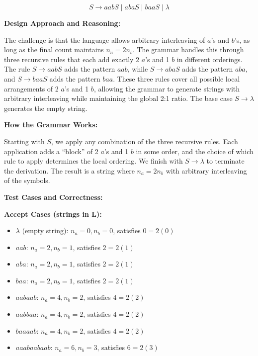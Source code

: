 \documentclass[12pt]{article}
\begin{document}
$$S \rightarrow aabS \mid abaS \mid baaS \mid \lambda$$

\textbf{Design Approach and Reasoning:}

The challenge is that the language allows arbitrary interleaving of $a$'s and $b$'s, as long as the final count maintains $n_a = 2n_b$. The grammar handles this through three recursive rules that each add exactly 2 $a$'s and 1 $b$ in different orderings. The rule $S \rightarrow aabS$ adds the pattern $aab$, while $S \rightarrow abaS$ adds the pattern $aba$, and $S \rightarrow baaS$ adds the pattern $baa$. These three rules cover all possible local arrangements of 2 $a$'s and 1 $b$, allowing the grammar to generate strings with arbitrary interleaving while maintaining the global 2:1 ratio. The base case $S \rightarrow \lambda$ generates the empty string.

\textbf{How the Grammar Works:}

Starting with $S$, we apply any combination of the three recursive rules. Each application adds a ``block'' of 2 $a$'s and 1 $b$ in some order, and the choice of which rule to apply determines the local ordering. We finish with $S \rightarrow \lambda$ to terminate the derivation. The result is a string where $n_a = 2n_b$ with arbitrary interleaving of the symbols.

\textbf{Test Cases and Correctness:}

\textbf{Accept Cases (strings in L):}
\begin{itemize}
\item $\lambda$ (empty string): $n_a=0, n_b=0$, satisfies $0 = 2(0)$ \checkmark
\item $aab$: $n_a=2, n_b=1$, satisfies $2 = 2(1)$ \checkmark
\item $aba$: $n_a=2, n_b=1$, satisfies $2 = 2(1)$ \checkmark
\item $baa$: $n_a=2, n_b=1$, satisfies $2 = 2(1)$ \checkmark
\item $aabaab$: $n_a=4, n_b=2$, satisfies $4 = 2(2)$ \checkmark
\item $aabbaa$: $n_a=4, n_b=2$, satisfies $4 = 2(2)$ \checkmark
\item $baaaab$: $n_a=4, n_b=2$, satisfies $4 = 2(2)$ \checkmark
\item $aaabaabaab$: $n_a=6, n_b=3$, satisfies $6 = 2(3)$ \checkmark
\end{itemize}
\end{document}
